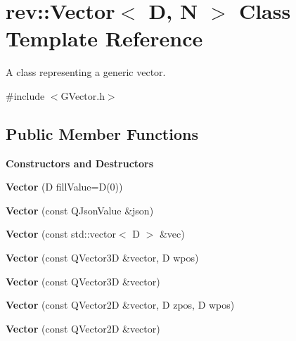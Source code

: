 \hypertarget{classrev_1_1_vector}{}\section{rev\+::Vector$<$ D, N $>$ Class Template Reference}
\label{classrev_1_1_vector}


A class representing a generic vector.  




{\ttfamily \#include $<$G\+Vector.\+h$>$}

\subsection*{Public Member Functions}
\begin{Indent}\textbf{ Constructors and Destructors}\par
\begin{DoxyCompactItemize}
\item 
\mbox{\label{classrev_1_1_vector_a47d5d058d43d64afd52fbc4d765a628b}} 
{\bfseries Vector} (D fill\+Value=D(0))
\item 
\mbox{\label{classrev_1_1_vector_a7031a4584e128a70a5cea504971823b4}} 
{\bfseries Vector} (const Q\+Json\+Value \&json)
\item 
\mbox{\label{classrev_1_1_vector_a159825f3f04ecf05477e118b4a024bd6}} 
{\bfseries Vector} (const std\+::vector$<$ D $>$ \&vec)
\item 
\mbox{\label{classrev_1_1_vector_a8b94692bc353f2694cb2772d3254f86c}} 
{\bfseries Vector} (const Q\+Vector3D \&vector, D wpos)
\item 
\mbox{\label{classrev_1_1_vector_a40256a5c1369693d800e5cdec0be816d}} 
{\bfseries Vector} (const Q\+Vector3D \&vector)
\item 
\mbox{\label{classrev_1_1_vector_ab43a85b52e567c2e72d7b2e78f9297b0}} 
{\bfseries Vector} (const Q\+Vector2D \&vector, D zpos, D wpos)
\item 
\mbox{\label{classrev_1_1_vector_aff5fda6cca4debb03e8f30a7f27013e6}} 
{\bfseries Vector} (const Q\+Vector2D \&vector)

\end{DoxyCompactItemize}
\end{Indent}
